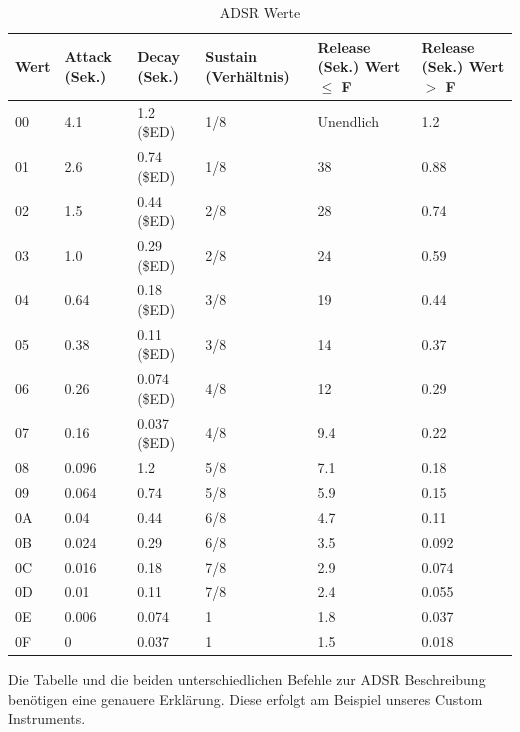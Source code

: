 \begin{table}
\begin{tabularx}{\textwidth}{|l|X|X|X|X|X|}
	\hline
	Wert & Attack (Sek.) & Decay (Sek.)  & Sustain (Verhältnis) & Release (Sek.) Wert $\leq$ F & Release (Sek.) Wert $>$ F \\
	\hline
	00 & 4.1 & 1.2 (\$ED) & 1/8 & Unendlich & 1.2\\
	\hline
	01 & 2.6 & 0.74 (\$ED) & 1/8 & 38 & 0.88 \\
	\hline
	02 & 1.5 & 0.44 (\$ED) & 2/8 & 28 & 0.74 \\
	\hline
	03 & 1.0 & 0.29 (\$ED) & 2/8 & 24 & 0.59 \\
	\hline
	04 & 0.64 & 0.18 (\$ED) & 3/8 & 19 & 0.44 \\
	\hline
	05 & 0.38 & 0.11 (\$ED) & 3/8 & 14 & 0.37 \\
	\hline
	06 & 0.26 & 0.074 (\$ED) & 4/8 & 12 & 0.29 \\
	\hline
	07 & 0.16 & 0.037 (\$ED) & 4/8 & 9.4 & 0.22 \\
	\hline
	08 & 0.096 & 1.2 & 5/8 & 7.1 & 0.18 \\
	\hline
	09 & 0.064 & 0.74 & 5/8 & 5.9 & 0.15 \\
	\hline
	0A & 0.04 & 0.44 & 6/8 & 4.7 & 0.11 \\
	\hline
	0B & 0.024 & 0.29 & 6/8 & 3.5 & 0.092 \\
	\hline
	0C & 0.016 & 0.18 & 7/8 & 2.9 & 0.074 \\
	\hline
	0D & 0.01 & 0.11 & 7/8 & 2.4 & 0.055 \\
	\hline
	0E & 0.006 & 0.074 & 1 & 1.8 & 0.037 \\
	\hline
	0F & 0 & 0.037 & 1 & 1.5 & 0.018 \\
	\hline
\end{tabularx}
\label{tab:ADSR}
\caption{ADSR Werte}
\end{table}

\bigskip

Die Tabelle und die beiden unterschiedlichen Befehle zur ADSR Beschreibung benötigen eine genauere Erklärung. Diese erfolgt am Beispiel unseres Custom Instruments.


\medskip



\medskip

